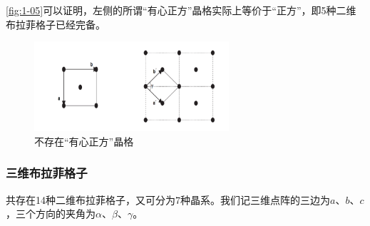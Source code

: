     \autoref{fig:1-05}可以证明，左侧的所谓“有心正方”晶格实际上等价于“正方”，即5种二维布拉菲格子已经完备。

    \begin{figure}[!htbp]
        \centering
        \includegraphics[height=9em, keepaspectratio=true]{pic/1-17}
        \caption{不存在“有心正方”晶格}
        \label{fig:1-05}
    \end{figure}

\subsubsection{三维布拉菲格子}
    共存在14种二维布拉菲格子，又可分为7种晶系。我们记三维点阵的三边为$a$、$b$、$c$，三个方向的夹角为$\alpha$、$\beta$、$\gamma$。

